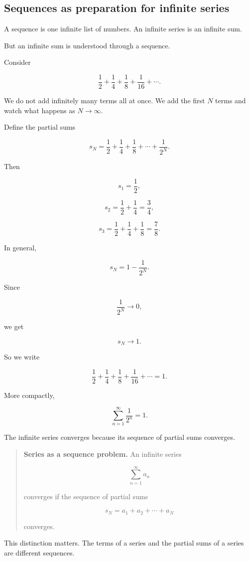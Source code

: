 \subsection{Sequences as preparation for infinite series}
\label{subsec:sequences-prepare-series}

A sequence is one infinite list of numbers.  An infinite series is an infinite sum.

But an infinite sum is understood through a sequence.

Consider

\[
\frac12+\frac14+\frac18+\frac1{16}+\cdots.
\]

We do not add infinitely many terms all at once.  We add the first \(N\) terms and watch what happens as \(N\to\infty\).

Define the partial sums

\[
s_N=\frac12+\frac14+\frac18+\cdots+\frac1{2^N}.
\]

Then

\[
s_1=\frac12,
\]

\[
s_2=\frac12+\frac14=\frac34,
\]

\[
s_3=\frac12+\frac14+\frac18=\frac78.
\]

In general,

\[
s_N=1-\frac1{2^N}.
\]

Since

\[
\frac1{2^N}\to0,
\]

we get

\[
s_N\to1.
\]

So we write

\[
\frac12+\frac14+\frac18+\frac1{16}+\cdots=1.
\]

More compactly,

\[
\sum_{n=1}^{\infty}\frac1{2^n}=1.
\]

The infinite series converges because its sequence of partial sums converges.

\begin{quote}
\textbf{Series as a sequence problem.}
An infinite series

\[
\sum_{n=1}^{\infty}a_n
\]

converges if the sequence of partial sums

\[
s_N=a_1+a_2+\cdots+a_N
\]

converges.
\end{quote}

This distinction matters.  The terms of a series and the partial sums of a series are different sequences.

